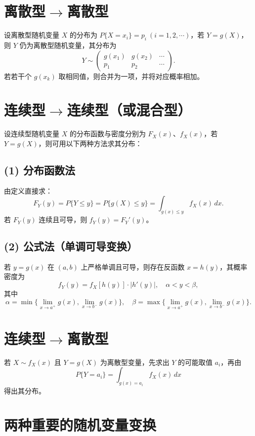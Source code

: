 
\section{离散型$\rightarrow$离散型}
设离散型随机变量 $X$ 的分布为 $P\{X = x_i\} = p_i \ (i=1,2,\cdots)$，若 $Y = g(X)$，则 $Y$ 仍为离散型随机变量，其分布为
$$
      Y \sim
      \begin{pmatrix}
            g(x_1) & g(x_2) & \cdots \\
            p_1    & p_2    & \cdots
      \end{pmatrix}.
$$
若若干个 $g(x_k)$ 取相同值，则合并为一项，并将对应概率相加。

\section{连续型$\rightarrow$连续型（或混合型）}
设连续型随机变量 $X$ 的分布函数与密度分别为 $F_X(x)$、$f_X(x)$，若 $Y = g(X)$，则可用以下两种方法求其分布：

\subsection*{(1) 分布函数法}
由定义直接求：
$$
      F_Y(y) = P\{Y \le y\} = P\{g(X) \le y\} = \int_{g(x) \le y} f_X(x) \, dx.
$$
若 $F_Y(y)$ 连续且可导，则 $f_Y(y) = F_Y'(y)$。

\subsection*{(2) 公式法（单调可导变换）}
若 $y = g(x)$ 在 $(a,b)$ 上严格单调且可导，则存在反函数 $x = h(y)$，其概率密度为
$$
      f_Y(y) = f_X[h(y)] \cdot |h'(y)|, \quad \alpha < y < \beta,
$$
其中
$$
      \alpha = \min\{\lim_{x\to a^+} g(x), \lim_{x\to b^-} g(x)\}, \quad
      \beta = \max\{\lim_{x\to a^+} g(x), \lim_{x\to b^-} g(x)\}.
$$

\section{连续型$\rightarrow$离散型}
若 $X \sim f_X(x)$ 且 $Y = g(X)$ 为离散型变量，先求出 $Y$ 的可能取值 $a_i$，再由
$$
      P\{Y = a_i\} = \int_{g(x)=a_i} f_X(x) \, dx
$$
得出其分布。
\section{两种重要的随机变量变换}

